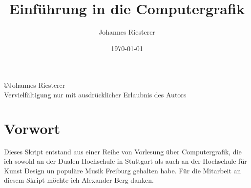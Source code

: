 \title{Einführung in die Computergrafik}
\author{Johannes Riesterer}
\date{\today}
\maketitle\thispagestyle{empty}
\newpage 
\begin{center}
\large
 \copyright Johannes Riesterer \\
Vervielfältigung nur mit ausdrücklicher Erlaubnis des Autors
\end{center}
\thispagestyle{empty}
\newpage

\section*{Vorwort}
\mbox{}\thispagestyle{empty}

Dieses Skript entstand aus einer Reihe von Vorlesung über Computergrafik, die ich sowohl an der Dualen Hochschule in Stuttgart als auch an der Hochschule für 
Kunst Design un populäre Musik Freiburg gehalten habe. Für die Mitarbeit an diesem Skript möchte ich Alexander Berg  danken.

\newpage
